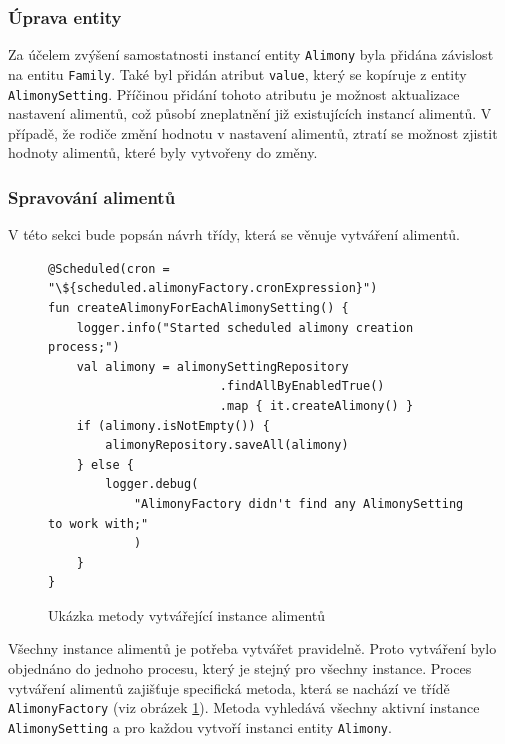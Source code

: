         \subsubsection{Úprava entity}
            Za účelem zvýšení samostatnosti instancí entity \verb|Alimony| byla přidána závislost na entitu \verb|Family|. Také byl přidán atribut \verb|value|, který se kopíruje z entity \verb|AlimonySetting|. Příčinou přidání tohoto atributu je možnost aktualizace nastavení alimentů, což působí zneplatnění již existujících instancí alimentů. V případě, že rodiče změní hodnotu v nastavení alimentů, ztratí se možnost zjistit hodnoty alimentů, které byly vytvořeny do změny.
            
        \subsubsection{Spravování alimentů} 
            V této sekci bude popsán návrh třídy, která se věnuje vytváření alimentů.
            \begin{figure}
                \begin{verbatim}
@Scheduled(cron = "\${scheduled.alimonyFactory.cronExpression}")
fun createAlimonyForEachAlimonySetting() {
    logger.info("Started scheduled alimony creation process;")
    val alimony = alimonySettingRepository
                        .findAllByEnabledTrue()
                        .map { it.createAlimony() }
    if (alimony.isNotEmpty()) {
        alimonyRepository.saveAll(alimony)
    } else {
        logger.debug(
            "AlimonyFactory didn't find any AlimonySetting to work with;"
            )
    }
}
                \end{verbatim}
                \caption{Ukázka metody vytvářející instance alimentů} 
                \label{code:create-alimony}
            \end{figure}
            Všechny instance alimentů je potřeba vytvářet pravidelně. Proto vytváření bylo objednáno do jednoho procesu, který je stejný pro všechny instance. Proces vytváření alimentů zajišťuje specifická metoda, která se nachází ve třídě \verb|AlimonyFactory| (viz obrázek \ref{code:create-alimony}). Metoda vyhledává všechny aktivní instance \verb|AlimonySetting| a pro každou vytvoří instanci entity \verb|Alimony|. 
            

